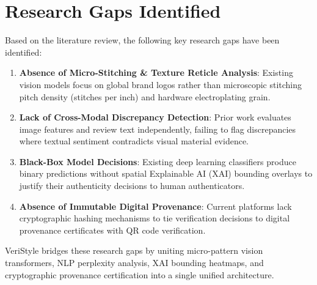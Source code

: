 \section{Research Gaps Identified}
Based on the literature review, the following key research gaps have been identified:
\begin{enumerate}
    \item \textbf{Absence of Micro-Stitching \& Texture Reticle Analysis}: Existing vision models focus on global brand logos rather than microscopic stitching pitch density (stitches per inch) and hardware electroplating grain.
    \item \textbf{Lack of Cross-Modal Discrepancy Detection}: Prior work evaluates image features and review text independently, failing to flag discrepancies where textual sentiment contradicts visual material evidence.
    \item \textbf{Black-Box Model Decisions}: Existing deep learning classifiers produce binary predictions without spatial Explainable AI (XAI) bounding overlays to justify their authenticity decisions to human authenticators.
    \item \textbf{Absence of Immutable Digital Provenance}: Current platforms lack cryptographic hashing mechanisms to tie verification decisions to digital provenance certificates with QR code verification.
\end{enumerate}

VeriStyle bridges these research gaps by uniting micro-pattern vision transformers, NLP perplexity analysis, XAI bounding heatmaps, and cryptographic provenance certification into a single unified architecture.
